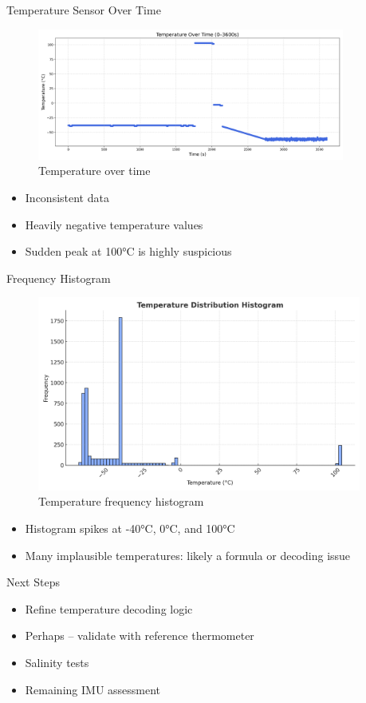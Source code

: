 \begin{frame}{Temperature Sensor Over Time}
    \begin{figure}
        \centering
        \includegraphics[height=0.5\textheight,width=0.9\textwidth,keepaspectratio]{images/temp_over_time.png}
        \caption{Temperature over time}
    \end{figure}
    \vspace{-1em}
    \begin{itemize}
        \item Inconsistent data
        \item Heavily negative temperature values
        \item Sudden peak at 100°C is highly suspicious
    \end{itemize}
\end{frame}

\begin{frame}{Frequency Histogram}
    \begin{figure}
        \centering
        \includegraphics[height=0.6\textheight,width=0.95\textwidth,keepaspectratio]{images/temp_histogram.png}
        \caption{Temperature frequency histogram}
    \end{figure}
    \vspace{-0.5em}
    \begin{itemize}
        \item Histogram spikes at  -40°C, 0°C, and 100°C
        \item Many implausible temperatures: likely a formula or decoding issue
    \end{itemize}
\end{frame}

\begin{frame}{Next Steps}
    \begin{itemize}
        \item Refine temperature decoding logic
        \item Perhaps -- validate with reference thermometer
        \item Salinity tests
        \item Remaining IMU assessment
    \end{itemize}
\end{frame}